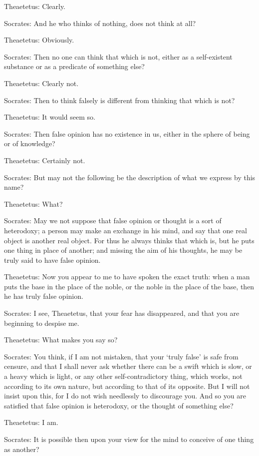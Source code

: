 Theaetetus: Clearly.

Socrates: And he who thinks of nothing, does not think at all?

Theaetetus: Obviously.

Socrates: Then no one can think that which is not, either as a
self-existent substance or as a predicate of something else?

Theaetetus: Clearly not.

Socrates: Then to think falsely is different from thinking that which is
not?

Theaetetus: It would seem so.

Socrates: Then false opinion has no existence in us, either in the
sphere of being or of knowledge?

Theaetetus: Certainly not.

Socrates: But may not the following be the description of what we
express by this name?

Theaetetus: What?

Socrates: May we not suppose that false opinion or thought is a sort of
heterodoxy; a person may make an exchange in his mind, and say that one
real object is another real object. For thus he always thinks that which
is, but he puts one thing in place of another; and missing the aim of
his thoughts, he may be truly said to have false opinion.

Theaetetus: Now you appear to me to have spoken the exact truth: when a
man puts the base in the place of the noble, or the noble in the place
of the base, then he has truly false opinion.

Socrates: I see, Theaetetus, that your fear has disappeared, and that
you are beginning to despise me.

Theaetetus: What makes you say so?

Socrates: You think, if I am not mistaken, that your `truly false' is
safe from censure, and that I shall never ask whether there can be
a swift which is slow, or a heavy which is light, or any other
self-contradictory thing, which works, not according to its own nature,
but according to that of its opposite. But I will not insist upon this,
for I do not wish needlessly to discourage you. And so you are satisfied
that false opinion is heterodoxy, or the thought of something else?

Theaetetus: I am.

Socrates: It is possible then upon your view for the mind to conceive of
one thing as another?

